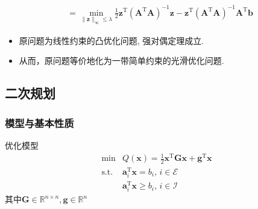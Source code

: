 \begin{example}
\begin{solution}
\[\begin{aligned}
                &=\min_{\|\boldsymbol{z}\|_\infty\leqslant\lambda}\frac12\boldsymbol{z}^{\mathrm{T}}(\boldsymbol{A}^{\mathrm{T}}\boldsymbol{A})^{-1}\boldsymbol{z}-\boldsymbol{z}^{\mathrm{T}}(\boldsymbol{A}^{\mathrm{T}}\boldsymbol{A})^{-1}\boldsymbol{A}^{\mathrm{T}}\boldsymbol{b}
            \end{aligned}
        \]
        \begin{itemize}
            \item 原问题为线性约束的凸优化问题, 强对偶定理成立.
            \item 从而，原问题等价地化为一带简单约束的光滑优化问题.
        \end{itemize}
    \end{solution}
\end{example}
\subsection{二次规划}
\subsubsection{模型与基本性质}
优化模型
\[
    \begin{array}{rl}
        \operatorname*{min} & Q(\boldsymbol{x})=\frac{1}{2}\boldsymbol{x}^{\mathrm{T}}\boldsymbol{G}\boldsymbol{x}+\boldsymbol{g}^{\mathrm{T}}\boldsymbol{x}\\
        \mathrm{s.t.} & \boldsymbol{a}_{i}^{\mathrm{T}}\boldsymbol{x}=b_{i},\,i\in\mathcal{E}\\
         & \boldsymbol{a}_{i}^{\mathrm{T}}\boldsymbol{x}\geqslant b_{i},\,i\in\mathcal{I}
    \end{array}
\]
其中$\boldsymbol{G}\in\mathbb{R}^{n\times n},\boldsymbol{g}\in\mathbb{R}^{n}$

